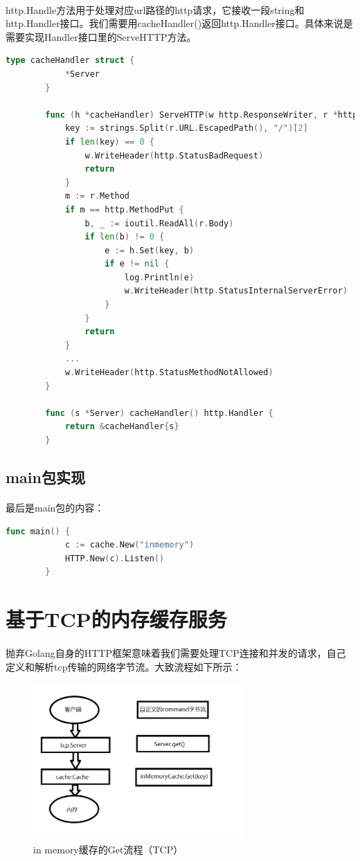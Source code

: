\documentclass{article}
\begin{document}
	\paragraph{}
	http.Handle方法用于处理对应url路径的http请求，它接收一段string和http.Handler接口。我们需要用cacheHandler()返回http.Handler接口。具体来说是需要实现Handler接口里的ServeHTTP方法。
	\begin{lstlisting}[language=Go]
		type cacheHandler struct {
			*Server
		}
		
		func (h *cacheHandler) ServeHTTP(w http.ResponseWriter, r *http.Request) {
			key := strings.Split(r.URL.EscapedPath(), "/")[2]
			if len(key) == 0 {
				w.WriteHeader(http.StatusBadRequest)
				return
			}
			m := r.Method
			if m == http.MethodPut {
				b, _ := ioutil.ReadAll(r.Body)
				if len(b) != 0 {
					e := h.Set(key, b)
					if e != nil {
						log.Println(e)
						w.WriteHeader(http.StatusInternalServerError)
					}
				}
				return
			}
			...
			w.WriteHeader(http.StatusMethodNotAllowed)
		}
		
		func (s *Server) cacheHandler() http.Handler {
			return &cacheHandler{s}
		}
	\end{lstlisting}
	\subsection{main包实现}
	\paragraph{}
	最后是main包的内容：
	\begin{lstlisting}[language=Go]
		func main() {
			c := cache.New("inmemory")
			HTTP.New(c).Listen()
		}
	\end{lstlisting}

	\section{基于TCP的内存缓存服务}
	\paragraph{}
	抛弃Golang自身的HTTP框架意味着我们需要处理TCP连接和并发的请求，自己定义和解析tcp传输的网络字节流。大致流程如下所示：
	\begin{figure}[h]
		\caption{in memory缓存的Get流程（TCP）}
		\centering
		\includegraphics[width=8cm, height=6cm]{tcpGet.png}
	\end{figure}
\end{document}
